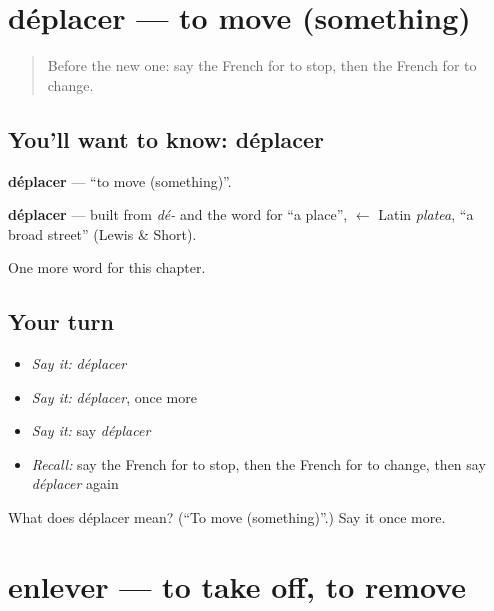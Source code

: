 \section[déplacer]{déplacer — to move (something)}

\label{lesson:FR-C176-deplacer}



\begin{quote}
Before the new one: say the French for to stop, then the French for to change.
\end{quote}

\subsection*{You'll want to know: déplacer}
\textbf{déplacer} — \textquotedblleft{}to move (something)\textquotedblright{}.

\begin{cousinweb}
\textbf{déplacer} — built from \emph{dé-} and the word for \textquotedblleft{}a place\textquotedblright{}, $\leftarrow$ Latin \emph{platea}, \textquotedblleft{}a broad street\textquotedblright{} (Lewis \& Short).
\end{cousinweb}

\begin{grammarlens}[title={What you've built}]
One more word for this chapter.
\end{grammarlens}

\subsection*{Your turn}
\begin{itemize}
\raggedright
  \item \emph{Say it:} \emph{déplacer}
  \item \emph{Say it:} \emph{déplacer}, once more
  \item \emph{Say it:} say \emph{déplacer}
  \item \emph{Recall:} say the French for to stop, then the French for to change, then say \emph{déplacer} again
\end{itemize}

\begin{tcolorbox}[breakable,colback=teal!4,colframe=teal!35!black,title={Before you move on}]
What does déplacer mean? (\textquotedblleft{}To move (something)\textquotedblright{}.) Say it once more.
\end{tcolorbox}
\section[enlever]{enlever — to take off, to remove}


